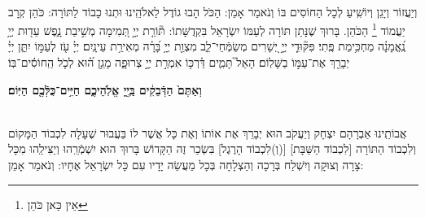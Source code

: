 \documentclass[twoside, openany, parskip=half, 11pt]{book}
\begin{document}
\avharachamim

\\
וְיַעֲזוֹר וְיָגֵן וְיוֹשִֽׁיעַ לְכָל הַחוֹסִים בּוֹ וְנֹאמַר אָמֵן:
 הַכֹּל הָבוּ גוֹדֶל לֵאלֹהֵֽינוּ וּתְנוּ כָבוֹד לַתּוֹרָה: כֹּהֵן קְרָב יַעֲמוֹד 
 \footnote{ אֵין כַּאן כֹּהֵן} 
 הַכֹּהֵן. בָּרוּךְ שֶׁנָּתַן תּוֹרָה לְעַמּוֹ יִשְׂרָאֵל בִּקְדֻשָּׁתוֹ:
תּ֘וֹרַ֤ת יְיָ֣ תְּ֭מִימָה מְשִׁ֣יבַת נָ֑פֶשׁ עֵד֖וּת יְיָ֥ נֶֽ֝אֱמָנָ֗ה מַחְכִּ֥ימַת פֶּֽתִי׃ פִּקּ֘וּדֵ֤י יְיָ֣ יְ֭שָׁרִים מְשַׂמְּֿחֵי־לֵ֑ב מִצְוַ֖ת יְיָ֥ בָּ֝רָ֗ה מְאִירַ֥ת עֵינָֽיִם׃
 יְיָ֗ עֹ֖ז לְעַמּ֣וֹ יִתֵּ֑ן יְיָ֓ יְבָרֵ֖ךְ אֶת־עַמּ֣וֹ בַשָּׁלֽוֹם׃ 
 הָאֵל֮ תָּמִ֢ים דַּ֫רְכּ֥וֹ אִמְרַ֣ת יְיָ֣ צְרוּפָ֑ה מָגֵ֥ן ה֝֗וּא לְכֹ֤ל הַֽחוֹסִ֬ים־בּֽוֹ׃


\textbf{וְאַתֶּם֙ הַדְּֿבֵקִ֔ים בַּֽיְ֖יָ אֱלֹֽהֵיכֶ֑ם חַיִּ֥ים־כֻּלְּֿכֶ֖ם הַיּֽוֹם׃} 

\nextpage

\torahbarachu 

\hagomel

\\
 אֲבוֹתֵֽינוּ אַבְרָהָם יִצְחָק וְיַעֲקֹב הוּא יְבָרֵךְ אֶת 
 אוֹתוֹ וְאֶת כָּל אֲשֶׁר לוֹ 
בַּעֲבוּר שֶׁעָלָה לִכְבוֹד הַמָּקוֹם וְלִכְבוֹד הַתּוֹרָה 
[לִכְבוֹד הַשַּׁבָּת]
[(וְ)לִכְבוֹד הָרֶגֶל]
 בִּשְׂכַר זֶה הַקָּדוֹשׁ בָּרוּךְ הוּא יִשְׁמְֿרֵֽהוּ וְיַצִּילֵֽהוּ מִכָּל צָרָה וְצוּקָה וְיִשְׁלַח בְּרָכָה וְהַצְלָחָה בְּכָל מַעֲשֵׂה יָדָיו עִם כָּל יִשְׂרָאֵל אֶחָיו: וְנֹאמַר אָמֵן:
\end{document}
